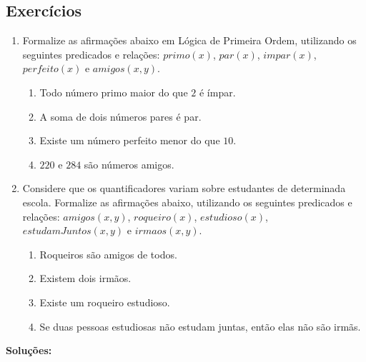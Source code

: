     \subsection{Exercícios}

    \begin{enumerate}
        \item Formalize as afirmações abaixo em Lógica de Primeira Ordem, utilizando os seguintes predicados e relações: $primo(x)$, $par(x)$, $impar(x)$, $perfeito(x)$ e $amigos(x, y)$.
        \begin{enumerate}
            \item Todo número primo maior do que $2$ é ímpar.
            \item A soma de dois números pares é par.
            \item Existe um número perfeito menor do que $10$.
            \item $220$ e $284$ são números amigos.
        \end{enumerate}
        \item Considere que os quantificadores variam sobre estudantes de determinada escola. Formalize as afirmações abaixo, utilizando os seguintes predicados e relações: $amigos(x, y)$, $roqueiro(x)$, $estudioso(x)$, $estudamJuntos(x, y)$ e $irmaos(x, y)$.
        \begin{enumerate}
            \item Roqueiros são amigos de todos.
            \item Existem dois irmãos.
            \item Existe um roqueiro estudioso.
            \item Se duas pessoas estudiosas não estudam juntas, então elas não são irmãs.
        \end{enumerate}
    \end{enumerate}

    \textbf{Soluções:}


